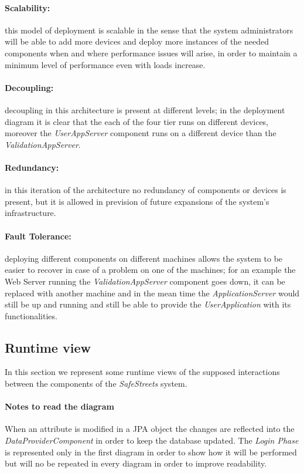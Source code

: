 \paragraph{Scalability:}this model of deployment is scalable in the sense that the system administrators will be able to add more devices and deploy more instances of the needed components when and where performance issues will arise, in order to maintain a minimum level of performance even with loads increase.
\paragraph{Decoupling:}decoupling in this architecture is present at different levels; in the deployment diagram it is clear that the each of the four tier runs on different devices, moreover the \emph{UserAppServer} component runs on a different device than the \emph{ValidationAppServer}.
\paragraph{Redundancy:}in this iteration of the architecture no redundancy of components or devices is present, but it is allowed in prevision of future expansions of the system's infrastructure.
\paragraph{Fault Tolerance:}deploying different components on different machines allows the system to be easier to recover in case of a problem on one of the machines; for an example the Web Server running the \textit{ValidationAppServer} component goes down, it can be replaced with another machine and in the mean time the \textit{ApplicationServer} would still be up and running and still be able to provide the \textit{UserApplication} with its functionalities.

\clearpage
\subsection{Runtime view}
In this section we represent some runtime views of the supposed interactions between the components of the \emph{SafeStreets} system.

\paragraph{Notes to read the diagram} When an attribute is modified in a JPA object the changes are reflected into the
	\emph{DataProviderComponent} in order to keep the database updated. 	The \emph{Login Phase} is represented only in the first diagram in order to show how it will be performed but will no be 
	repeated in every diagram in order to improve readability.

